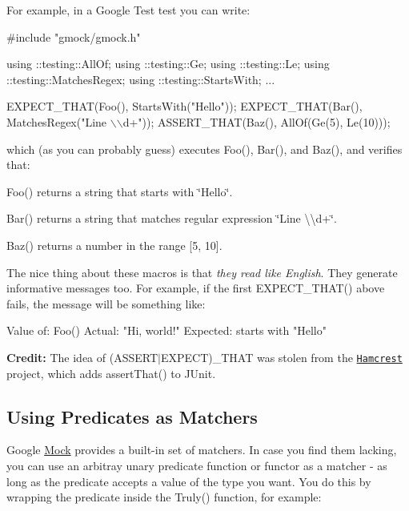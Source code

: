 For example, in a Google Test test you can write\+:


\begin{DoxyCode}
#include "gmock/gmock.h"

using ::testing::AllOf;
using ::testing::Ge;
using ::testing::Le;
using ::testing::MatchesRegex;
using ::testing::StartsWith;
...

  EXPECT\_THAT(Foo(), StartsWith("Hello"));
  EXPECT\_THAT(Bar(), MatchesRegex("Line \(\backslash\)\(\backslash\)d+"));
  ASSERT\_THAT(Baz(), AllOf(Ge(5), Le(10)));
\end{DoxyCode}


which (as you can probably guess) executes {\ttfamily Foo()}, {\ttfamily Bar()}, and {\ttfamily Baz()}, and verifies that\+:


\begin{DoxyItemize}
\item {\ttfamily Foo()} returns a string that starts with {\ttfamily \char`\"{}\+Hello\char`\"{}}.
\item {\ttfamily Bar()} returns a string that matches regular expression {\ttfamily \char`\"{}\+Line \textbackslash{}\textbackslash{}d+\char`\"{}}.
\item {\ttfamily Baz()} returns a number in the range \mbox{[}5, 10\mbox{]}.
\end{DoxyItemize}

The nice thing about these macros is that {\itshape they read like English}. They generate informative messages too. For example, if the first {\ttfamily E\+X\+P\+E\+C\+T\+\_\+\+T\+H\+A\+T()} above fails, the message will be something like\+:


\begin{DoxyCode}
Value of: Foo()
  Actual: "Hi, world!"
Expected: starts with "Hello"
\end{DoxyCode}


{\bfseries Credit\+:} The idea of {\ttfamily (A\+S\+S\+E\+R\+T$\vert$\+E\+X\+P\+E\+CT)\+\_\+\+T\+H\+AT} was stolen from the \href{http://code.google.com/p/hamcrest/}{\tt Hamcrest} project, which adds {\ttfamily assert\+That()} to J\+Unit.

\subsection*{Using Predicates as Matchers}

Google \hyperlink{class_mock}{Mock} provides a built-\/in set of matchers. In case you find them lacking, you can use an arbitray unary predicate function or functor as a matcher -\/ as long as the predicate accepts a value of the type you want. You do this by wrapping the predicate inside the {\ttfamily Truly()} function, for example\+:


